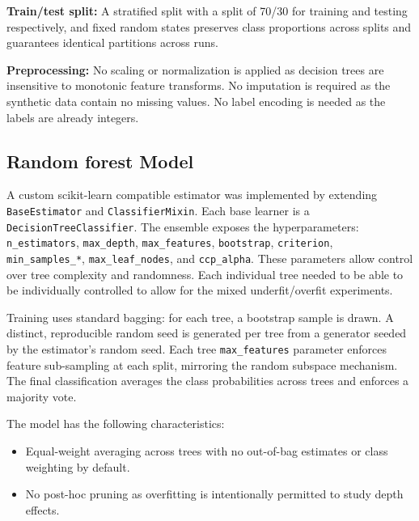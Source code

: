 \documentclass[conference]{IEEEtran}
\begin{document}
\textbf{Train/test split:} A stratified split with a split of 70/30 for training and testing respectively, and fixed random states preserves class proportions across splits and guarantees identical partitions across runs.


\textbf{Preprocessing:} No scaling or normalization is applied as decision trees are insensitive to monotonic feature transforms. No imputation is required as the synthetic data contain no missing values. No label encoding is needed as the labels are already integers.

\subsection{Random forest Model}

A custom scikit-learn compatible estimator was implemented by extending \texttt{BaseEstimator} and \texttt{ClassifierMixin}. Each base learner is a \texttt{DecisionTreeClassifier}. The 
ensemble exposes the hyperparameters: \texttt{n\_estimators}, \texttt{max\_depth}, \texttt{max\_features}, \texttt{bootstrap}, \texttt{criterion}, 
\texttt{min\_samples\_*}, \texttt{max\_leaf\_nodes}, and \texttt{ccp\_alpha}. These parameters allow control over tree complexity and randomness. Each individual tree needed 
to be able to be individually controlled to allow for the mixed underfit/overfit experiments.

Training uses standard bagging: for each tree, a bootstrap sample is drawn. A distinct, reproducible random seed is generated per tree from a generator seeded by the estimator's random seed. Each tree \texttt{max\_features} parameter enforces feature sub-sampling at each split, mirroring the random subspace mechanism. The final classification averages the class probabilities across trees and enforces a majority vote.

The model has the following characteristics:
\begin{itemize}
  \item Equal-weight averaging across trees with no out-of-bag estimates or class weighting by default.
  \item No post-hoc pruning as overfitting is intentionally permitted to study depth effects.
\end{itemize}
\end{document}

